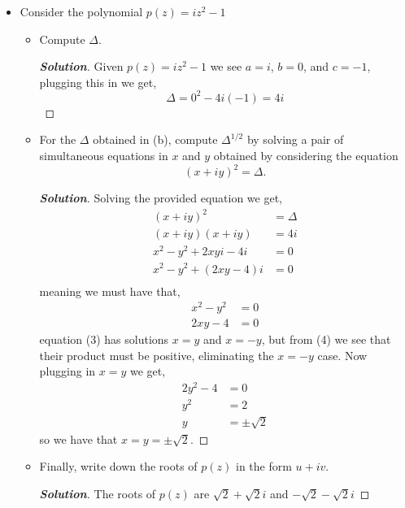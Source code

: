 \documentclass[11pt]{article}
\newenvironment{problem}[2][Problem\!]{\begin{trivlist}
\item[\hskip \labelsep {\bfseries #1}\hskip \labelsep {\bfseries #2.}]}{\end{trivlist}}
\newenvironment{solution}{\begin{proof}[\textbf{\textit{Solution}}]}{\end{proof}}
\begin{document}
\begin{problem}{1.1}
\begin{itemize}[itemsep=2em]
\begin{example}
\end{example}

\vspace*{2em} %


\item[(b)] Consider the polynomial $p(z) = iz^2 -1$
\begin{itemize}[itemsep=2em]
\item[(i)] Compute $\Delta$.
\begin{example}
    \begin{solution} 
        Given $p(z) = iz^{2} -1$ we see $a = i$, $b = 0$, and $c = -1$, plugging this in we get,
        \[\Delta = 0^{2} -4i(-1) = 4i\] 
    \end{solution}
\end{example}



\item[(ii)] For the $\Delta$ obtained in (b), compute $\Delta^{1/2}$ by solving a pair of simultaneous equations in $x$ and $y$ obtained by considering the equation \[(x + iy)^2 = \Delta.\]
\begin{example}     
    \begin{solution}
        Solving the provided equation we get,
        \begin{align*}
            (x + iy)^{2} &= \Delta \\
            (x+ iy)(x+iy) &= 4i \\ 
            x^{2} - y^{2} + 2xyi -4i &= 0 \\
            x^{2} -y^{2} + (2xy - 4)i &= 0 \\
        \end{align*}
        meaning we must have that,
        \begin{align}
            x^{2}-y^{2} &= 0 \\
            2xy - 4 & = 0
        \end{align}
        equation (3) has solutions $x = y$ and $x = -y$, but from (4) we see that their product must be positive, eliminating the $x=-y$ case. Now plugging in $x =y$ we get,
        \begin{align*}
            2y^{2} -4 &= 0 \\
            y^{2} &= 2 \\
            y &= \pm \sqrt2 
        \end{align*}
        so we have that $x = y = \pm \sqrt 2$.

    \end{solution} 
\end{example}
\item[(iii)] Finally, write down the roots of $p(z)$ in the form $u + iv$.
\begin{example}
    \begin{solution}
        The roots of $p(z)$ are $\sqrt2 + \sqrt2i$ and $-\sqrt2 - \sqrt2i$
    \end{solution} 
\end{example}
\end{itemize}
\end{itemize}
\end{problem}
\end{document}
